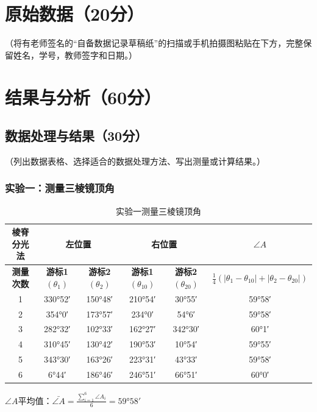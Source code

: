 \documentclass[]{../../templates/Report}%
\begin{document}
\begin{fullreportonly}
\section{原始数据（20分）}
（将有老师签名的“自备数据记录草稿纸”的扫描或手机拍摄图粘贴在下方，完整保留姓名，学号，教师签字和日期。）

\section{结果与分析（60分）}
\subsection{数据处理与结果（30分）}
（列出数据表格、选择适合的数据处理方法、写出测量或计算结果。）

\subsubsection{实验一：测量三棱镜顶角}
\begin{table}[H]
    \centering
    \caption{实验一测量三棱镜顶角}
    \begin{tabular}{|c|c|c|c|c|c|}
        \hline
        \textbf{棱脊分光法} & 
        \multicolumn{2}{|c|}{\textbf{左位置}} &
        \multicolumn{2}{|c|}{\textbf{右位置}} &
        \textbf{$\angle A$}  \\
        \hline
        \textbf{测量次数} & \textbf{游标1$(\theta_1)$} & \textbf{游标2$(\theta_2)$} & \textbf{游标1$(\theta_{10})$} & \textbf{游标2$(\theta_{20})$} & \textbf{$\frac{1}{4}(|\theta_1 - \theta_{10}| + |\theta_2 - \theta_{20}|)$}  \\
        \hline
        1 & \ang{330;52} & \ang{150;48} & \ang{210;54} & \ang{30;55} & \ang{59;58}  \\
        \hline
        2 & \ang{354;0} & \ang{173;57} & \ang{234;0} & \ang{54;6} & \ang{59;58}  \\
        \hline
        3 & \ang{282;32} & \ang{102;33} & \ang{162;27} & \ang{342;30} & \ang{60;1}  \\
        \hline
        4 & \ang{310;45} & \ang{130;42} & \ang{190;53} & \ang{10;54} & \ang{59;55}  \\
        \hline
        5 & \ang{343;30} & \ang{163;26} & \ang{223;31} & \ang{43;33} & \ang{59;58}  \\
        \hline
        6 & \ang{6;44} & \ang{186;46} & \ang{246;51} & \ang{66;51} & \ang{60;0}  \\
        \hline
    \end{tabular}
\end{table}
$\angle A$平均值：$\bar{\angle A} = \frac{\displaystyle\sum_{i=1}^6 \angle A_i}{6} = \ang{59;58}$


\end{fullreportonly}
\end{document}
